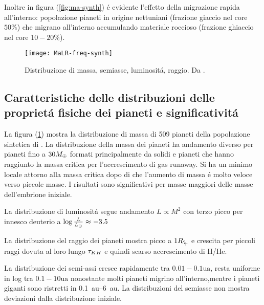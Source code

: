 Inoltre in figura (\ref{fig:ma-synth}) \'e evidente l'effetto della migrazione rapida all'interno: popolazione pianeti in origine nettuniani (frazione giaccio nel core $50\%$) che migrano all'interno accumulando materiale roccioso (frazione ghiaccio nel core $10-20\%$).

\begin{figure}[!ht]
\texttt{[image: MaLR-freq-synth]}
\caption{Distribuzione di massa, semiasse, luminosit\'a, raggio. Da \cite{mordasini2018planetary}. }\label{fig:MaLR-freq-synth}
\end{figure}

\subsection{Caratteristiche delle distribuzioni delle propriet\'a fisiche dei pianeti e significativit\'a}

La figura (\ref{fig:MaLR-freq-synth}) mostra la distribuzione di massa di 509 pianeti della popolazione sintetica di \cite{mordasini2018planetary}. La distribuzione della massa dei pianeti ha andamento diverso per pianeti fino a $30M_{\oplus}{}$ formati principalmente da solidi e pianeti che hanno raggiunto la massa critica per l'accrescimento di gas runaway.
Si ha un minimo locale attorno alla massa critica dopo di che l'aumento di massa \'e molto veloce verso piccole masse. I risultati sono significativi per masse maggiori delle masse dell'embrione iniziale.

\begin{workout}
La distribuzione di luminosit\'a segue andamento $L\propto M^2$ con terzo picco per innesco deuterio a $\log{\frac{L}{L_{\odot}}}\approx-3.5$
\end{workout}

La distribuzione del raggio dei pianeti mostra picco a $1\rjupiter$ e crescita per piccoli raggi dovuta al loro lungo $\tau_{KH}{}$ e quindi scarso accrescimento di H/He.

La distribuzione dei semi-assi cresce rapidamente tra $0.01-0.1\si{\astronomicalunit}$, resta uniforme in log tra $0.1-10\si{\astronomicalunit}$ nonostante molti pianeti migrino all'interno,mentre i pianeti giganti sono ristretti in \SIrange{0.1}{6}{\astronomicalunit}. La distribuzioni del semiasse non mostra deviazioni dalla distribuzione iniziale.

